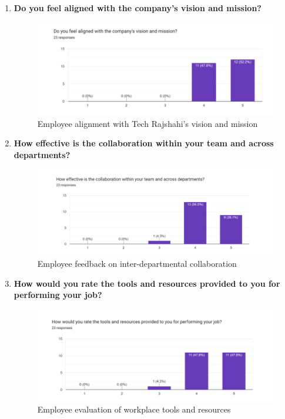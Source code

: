 \documentclass[12pt,a4paper]{article}
\begin{document}
\begin{enumerate}
    \item \textbf{Do you feel aligned with the company’s vision and mission?}  
    \begin{figure}[H]
        \centering
        \includegraphics[width=\textwidth]{Fig/vm.png}
        \caption{Employee alignment with Tech Rajshahi’s vision and mission}
        \label{fig:vision_mission}
    \end{figure}

    \item \textbf{How effective is the collaboration within your team and across departments?}  
    \begin{figure}[H]
        \centering
        \includegraphics[width=\textwidth]{Fig/colab.png}
        \caption{Employee feedback on inter-departmental collaboration}
        \label{fig:collaboration}
    \end{figure}

    \item \textbf{How would you rate the tools and resources provided to you for performing your job?}  
    \begin{figure}[H]
        \centering
        \includegraphics[width=\textwidth]{Fig/pj.png}
        \caption{Employee evaluation of workplace tools and resources}
        \label{fig:tools_resources}
    \end{figure}


\end{enumerate}
\end{document}
